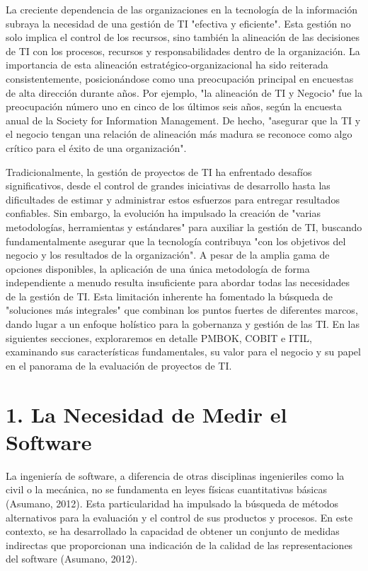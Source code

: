 \documentclass[11pt]{article}
\begin{document}
La creciente dependencia de las organizaciones en la tecnología de la información subraya la necesidad de una gestión de TI "efectiva y eficiente". Esta gestión no solo implica el control de los recursos, sino también la alineación de las decisiones de TI con los procesos, recursos y responsabilidades dentro de la organización. La importancia de esta alineación estratégico-organizacional ha sido reiterada consistentemente, posicionándose como una preocupación principal en encuestas de alta dirección durante años. Por ejemplo, "la alineación de TI y Negocio" fue la preocupación número uno en cinco de los últimos seis años, según la encuesta anual de la Society for Information Management. De hecho, "asegurar que la TI y el negocio tengan una relación de alineación más madura se reconoce como algo crítico para el éxito de una organización".

Tradicionalmente, la gestión de proyectos de TI ha enfrentado desafíos significativos, desde el control de grandes iniciativas de desarrollo hasta las dificultades de estimar y administrar estos esfuerzos para entregar resultados confiables. Sin embargo, la evolución ha impulsado la creación de "varias metodologías, herramientas y estándares" para auxiliar la gestión de TI, buscando fundamentalmente asegurar que la tecnología contribuya "con los objetivos del negocio y los resultados de la organización". A pesar de la amplia gama de opciones disponibles, la aplicación de una única metodología de forma independiente a menudo resulta insuficiente para abordar todas las necesidades de la gestión de TI. Esta limitación inherente ha fomentado la búsqueda de "soluciones más integrales" que combinan los puntos fuertes de diferentes marcos, dando lugar a un enfoque holístico para la gobernanza y gestión de las TI. En las siguientes secciones, exploraremos en detalle PMBOK, COBIT e ITIL, examinando sus características fundamentales, su valor para el negocio y su papel en el panorama de la evaluación de proyectos de TI.

\cleardoublepage %

\section{1. La Necesidad de Medir el Software}

La ingeniería de software, a diferencia de otras disciplinas ingenieriles como la civil o la mecánica, no se fundamenta en leyes físicas cuantitativas básicas (Asumano, 2012). Esta particularidad ha impulsado la búsqueda de métodos alternativos para la evaluación y el control de sus productos y procesos. En este contexto, se ha desarrollado la capacidad de obtener un conjunto de medidas indirectas que proporcionan una indicación de la calidad de las representaciones del software (Asumano, 2012).
\end{document}
